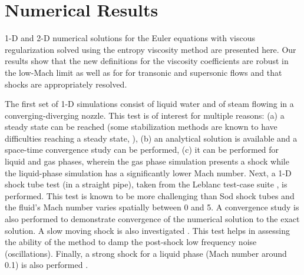 \documentclass[review,10pt]{elsarticle}
\begin{document}
\section{Numerical Results} \label{sec:results}

1-D and 2-D numerical solutions for the Euler equations with viscous regularization solved using the entropy 
viscosity method are presented here.
Our results show that the new definitions for the viscosity coefficients are robust in the low-Mach limit as well as for
for transonic and supersonic flows and that shocks are appropriately resolved. 

The first set of 1-D simulations consist of liquid water and of steam flowing in a converging-diverging nozzle. 
This test is of interest for multiple reasons: (a) a steady state can be reached (some stabilization methods 
are known to have difficulties reaching a steady state, \cite{FluxLimiter, FluxLimiter2}), (b) 
an analytical solution is available and a space-time convergence study can be performed, (c) it 
can be performed for liquid and gas phases, wherein the gas phase simulation presents a shock while 
the liquid-phase simulation has a significantly lower Mach number.
%
Next, a 1-D shock tube test (in a straight pipe), taken from the Leblanc test-case suite \cite{Leblanc}, 
is performed. This test is known to be more challenging than Sod shock tubes and the fluid's Mach 
number varies spatially between 0 and 5. A convergence study is also performed to demonstrate 
convergence of the numerical solution to the exact solution. 
%
A slow moving shock is also investigated \cite{james}. This test helps in assessing the ability of 
the method to damp the post-shock low frequency noise (oscillations). 
%
Finally, a strong shock for a liquid phase (Mach number around 0.1) is also performed \cite{abgrall}.
\end{document}
